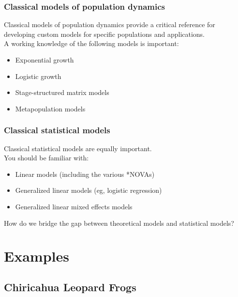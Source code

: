 \documentclass[color=usenames,dvipsnames]{beamer}\usepackage[]{graphicx}\usepackage[]{xcolor}
\begin{document}
\begin{frame}
  \frametitle{Classical models of population dynamics}
  Classical models of population dynamics provide a critical reference
  for developing custom models for specific populations and
  applications. \\
  \pause
  \vfill
  A working knowledge of the following models is important:
  \begin{itemize}
    \item Exponential growth
    \item Logistic growth
    \item Stage-structured matrix models
    \item Metapopulation models
  \end{itemize}
\end{frame}


\begin{frame}
  \frametitle{Classical statistical models}
  Classical statistical models are equally important. \\
  \pause
  \vfill
  You should be familiar with:
  \begin{itemize}
    \item Linear models (including the various *NOVAs)
    \item Generalized linear models (eg, logistic regression)
    \item Generalized linear mixed effects models
  \end{itemize}
\end{frame}



\begin{frame}
  \LARGE 
  \centering
  How do we bridge the gap between theoretical models and statistical 
  models?  \\
\end{frame}


\section{Examples}


\subsection{Chiricahua Leopard Frogs}
\end{document}
